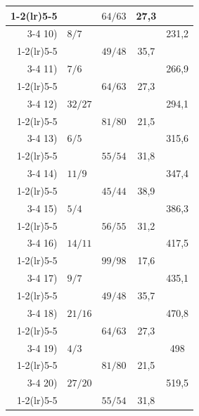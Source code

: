 {\begin{longtable}{r @{\;} l c c c}
  \cmidrule(lr){1-2}\cmidrule(lr){5-5}
     &           & $64/63$ & 27,3 &       \\
  \cmidrule(lr){3-4}
  10) & $8/7$ &           &      & 231,2 \\
  \cmidrule(lr){1-2}\cmidrule(lr){5-5}
     &           & $49/48$ & 35,7 &       \\
  \cmidrule(lr){3-4}
  11) & $7/6$ &           &      & 266,9 \\
  \cmidrule(lr){1-2}\cmidrule(lr){5-5}
     &           & $64/63$ & 27,3 &       \\
  \cmidrule(lr){3-4}
  12) & $32/27$ &           &      & 294,1 \\
  \cmidrule(lr){1-2}\cmidrule(lr){5-5}
     &           & $81/80$ & 21,5 &       \\
  \cmidrule(lr){3-4}
  13) & $6/5$ &           &      & 315,6 \\
  \cmidrule(lr){1-2}\cmidrule(lr){5-5}
     &           & $55/54$ & 31,8 &       \\
  \cmidrule(lr){3-4}
  14) & $11/9$ &           &      & 347,4 \\
  \cmidrule(lr){1-2}\cmidrule(lr){5-5}
     &           & $45/44$ & 38,9 &       \\
  \cmidrule(lr){3-4}
  15) & $5/4$ &           &      & 386,3 \\
  \cmidrule(lr){1-2}\cmidrule(lr){5-5}
     &           & $56/55$ & 31,2 &       \\
  \cmidrule(lr){3-4}
  16) & $14/11$ &           &      & 417,5 \\
  \cmidrule(lr){1-2}\cmidrule(lr){5-5}
     &           & $99/98$ & 17,6 &       \\
  \cmidrule(lr){3-4}
  17) & $9/7$ &           &      & 435,1 \\
  \cmidrule(lr){1-2}\cmidrule(lr){5-5}
     &           & $49/48$ & 35,7 &       \\
  \cmidrule(lr){3-4}
  18) & $21/16$ &           &      & 470,8 \\
  \cmidrule(lr){1-2}\cmidrule(lr){5-5}
     &           & $64/63$ & 27,3 &       \\
  \cmidrule(lr){3-4}
  19) & $4/3$ &           &      & 498 \\
  \cmidrule(lr){1-2}\cmidrule(lr){5-5}
     &           & $81/80$ & 21,5 &       \\
  \cmidrule(lr){3-4}
  20) & $27/20$ &           &      & 519,5 \\
  \cmidrule(lr){1-2}\cmidrule(lr){5-5}
     &           & $55/54$ & 31,8 &       \\

\end{longtable}}
